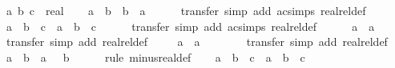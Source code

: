 \begin{isabellebody}
\ a\ b\ c\ {\isacharcolon}{\kern0pt}{\isacharcolon}{\kern0pt}\ real\isanewline
\ \ \isamarkupfalse%
\ {\isachardoublequoteopen}a\ {\isacharplus}{\kern0pt}\ b\ {\isacharequal}{\kern0pt}\ b\ {\isacharplus}{\kern0pt}\ a{\isachardoublequoteclose}\isanewline
\ \ \ \ \isamarkupfalse%
\ transfer\ {\isacharparenleft}{\kern0pt}simp\ add{\isacharcolon}{\kern0pt}\ ac{\isacharunderscore}{\kern0pt}simps\ realrel{\isacharunderscore}{\kern0pt}def{\isacharparenright}{\kern0pt}\isanewline
\ \ \isamarkupfalse%
\ {\isachardoublequoteopen}{\isacharparenleft}{\kern0pt}a\ {\isacharplus}{\kern0pt}\ b{\isacharparenright}{\kern0pt}\ {\isacharplus}{\kern0pt}\ c\ {\isacharequal}{\kern0pt}\ a\ {\isacharplus}{\kern0pt}\ {\isacharparenleft}{\kern0pt}b\ {\isacharplus}{\kern0pt}\ c{\isacharparenright}{\kern0pt}{\isachardoublequoteclose}\isanewline
\ \ \ \ \isamarkupfalse%
\ transfer\ {\isacharparenleft}{\kern0pt}simp\ add{\isacharcolon}{\kern0pt}\ ac{\isacharunderscore}{\kern0pt}simps\ realrel{\isacharunderscore}{\kern0pt}def{\isacharparenright}{\kern0pt}\isanewline
\ \ \isamarkupfalse%
\ {\isachardoublequoteopen}{}\ {\isacharplus}{\kern0pt}\ a\ {\isacharequal}{\kern0pt}\ a{\isachardoublequoteclose}\isanewline
\ \ \ \ \isamarkupfalse%
\ transfer\ {\isacharparenleft}{\kern0pt}simp\ add{\isacharcolon}{\kern0pt}\ realrel{\isacharunderscore}{\kern0pt}def{\isacharparenright}{\kern0pt}\isanewline
\ \ \isamarkupfalse%
\ {\isachardoublequoteopen}{\isacharminus}{\kern0pt}\ a\ {\isacharplus}{\kern0pt}\ a\ {\isacharequal}{\kern0pt}\ {}{\isachardoublequoteclose}\isanewline
\ \ \ \ \isamarkupfalse%
\ transfer\ {\isacharparenleft}{\kern0pt}simp\ add{\isacharcolon}{\kern0pt}\ realrel{\isacharunderscore}{\kern0pt}def{\isacharparenright}{\kern0pt}\isanewline
\ \ \isamarkupfalse%
\ {\isachardoublequoteopen}a\ {\isacharminus}{\kern0pt}\ b\ {\isacharequal}{\kern0pt}\ a\ {\isacharplus}{\kern0pt}\ {\isacharminus}{\kern0pt}\ b{\isachardoublequoteclose}\isanewline
\ \ \ \ \isamarkupfalse%
\ {\isacharparenleft}{\kern0pt}rule\ minus{\isacharunderscore}{\kern0pt}real{\isacharunderscore}{\kern0pt}def{\isacharparenright}{\kern0pt}\isanewline
\ \ \isamarkupfalse%
\ {\isachardoublequoteopen}{\isacharparenleft}{\kern0pt}a\ {\isacharasterisk}{\kern0pt}\ b{\isacharparenright}{\kern0pt}\ {\isacharasterisk}{\kern0pt}\ c\ {\isacharequal}{\kern0pt}\ a\ {\isacharasterisk}{\kern0pt}\ {\isacharparenleft}{\kern0pt}b\ {\isacharasterisk}{\kern0pt}\ c{\isacharparenright}{\kern0pt}{\isachardoublequoteclose}\isanewline

\end{isabellebody}
